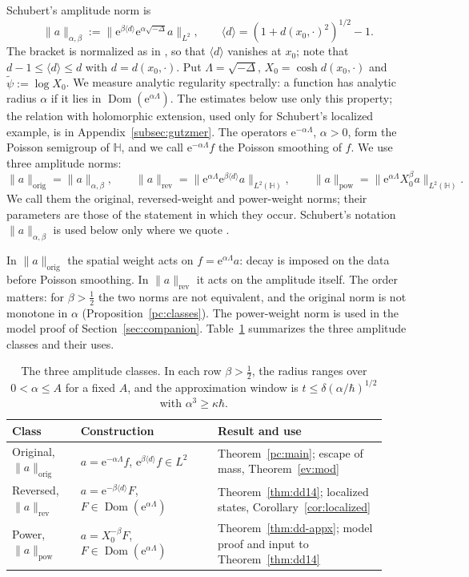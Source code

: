 \documentclass[twoside,10pt]{article}
\numberwithin{equation}{section}
\theoremstyle{slbody}
\theoremstyle{remark}
\newcommand{\Hb}{\mathbb{H}}
\newcommand{\norm}[1]{\lVert #1\rVert}
\newcommand{\ue}{\mathrm{e}}
\newcommand{\pcNorm}[1]{\norm{#1}_{\mathrm{orig}}}
\newcommand{\swNorm}[1]{\norm{#1}_{\mathrm{rev}}}
\newcommand{\pwNorm}[1]{\norm{#1}_{\mathrm{pow}}}
\begin{document}
Schubert's amplitude norm is \cite[Def.~1.1]{S}
\[
\norm{a}_{\alpha,\beta}:=\norm{\ue^{\beta\langle d\rangle}\ue^{\alpha\sqrt{-\Delta}}a}_{L^2},\qquad
\langle d\rangle=(1+d(x_0,\cdot)^2)^{1/2}-1 .
\]
The bracket is normalized as in \cite{S}, so that $\langle d\rangle$ vanishes at $x_0$; note that $d-1\le\langle d\rangle\le d$
with $d=d(x_0,\cdot)$.
Put $\Lambda=\sqrt{-\Delta}$, $X_0=\cosh d(x_0,\cdot)$ and $\tilde\psi:=\log X_0$.
We measure analytic regularity spectrally: a function has analytic radius $\alpha$ if it lies in
$\operatorname{Dom}(\ue^{\alpha\Lambda})$. The estimates below use only this property; the relation with holomorphic
extension, used only for Schubert's localized example, is in Appendix~\ref{subsec:gutzmer}. The operators $\ue^{-\alpha\Lambda}$,
$\alpha>0$, form the Poisson semigroup of $\Hb$, and we call $\ue^{-\alpha\Lambda}f$ the Poisson smoothing of $f$.
We use three amplitude norms:
\[
\pcNorm a=\norm a_{\alpha,\beta},\qquad
\swNorm a=\norm{\ue^{\alpha\Lambda}\ue^{\beta\langle d\rangle}a}_{L^2(\Hb)},\qquad
\pwNorm a=\norm{\ue^{\alpha\Lambda}X_0^\beta a}_{L^2(\Hb)}.
\]
We call them the original, reversed-weight and power-weight norms; their parameters are those of the statement in which
they occur. Schubert's notation $\norm a_{\alpha,\beta}$ is used below only where we quote \cite{S}.

In $\pcNorm a$ the spatial weight acts on $f=\ue^{\alpha\Lambda}a$: decay is imposed on the data before
Poisson smoothing. In $\swNorm a$ it acts on the amplitude itself. The order matters: for $\beta>\tfrac12$ the two
norms are not equivalent, and the original norm is not monotone in $\alpha$ (Proposition~\ref{pc:classes}). The
power-weight norm is used in the model proof of Section~\ref{sec:companion}.
Table~\ref{tab:classes} summarizes the three amplitude classes and their uses.

\begin{table}[tb]
\centering\small
\caption{The three amplitude classes. In each row $\beta>\tfrac12$, the radius ranges over $0<\alpha\le A$ for a fixed $A$, and
the approximation window is $t\le\delta(\alpha/\hbar)^{1/2}$ with $\alpha^3\ge\kappa\hbar$.}\label{tab:classes}
\begin{tabular}{@{}>{\raggedright\arraybackslash}p{0.17\linewidth}>{\raggedright\arraybackslash}p{0.34\linewidth}>{\raggedright\arraybackslash\hyphenpenalty=10000\exhyphenpenalty=10000}p{0.42\linewidth}@{}}
\hline
Class & Construction & Result and use\\
\hline
Original, $\pcNorm a$ &
$a=\ue^{-\alpha\Lambda}f$, $\ue^{\beta\langle d\rangle}f\in L^2$ &
Theorem~\ref{pc:main}; escape of mass, Theorem~\ref{ev:mod}\\[4pt]
Reversed, $\swNorm a$ &
$a=\ue^{-\beta\langle d\rangle}F$, $F\in\operatorname{Dom}(\ue^{\alpha\Lambda})$ &
Theorem~\ref{thm:dd14}; localized states, Corollary~\ref{cor:localized}\\[4pt]
Power, $\pwNorm a$ &
$a=X_0^{-\beta}F$, $F\in\operatorname{Dom}(\ue^{\alpha\Lambda})$ &
Theorem~\ref{thm:dd-appx}; model proof and input to Theorem~\ref{thm:dd14}\\
\hline
\end{tabular}
\end{table}
\end{document}
